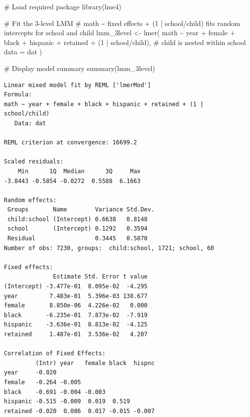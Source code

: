 \documentclass[
  letterpaper,
  DIV=11,
  numbers=noendperiod]{scrreprt}
\newenvironment{Shaded}{\begin{snugshade}}{\end{snugshade}}
\newcommand{\AttributeTok}[1]{\textcolor[rgb]{0.40,0.45,0.13}{#1}}
\newcommand{\CommentTok}[1]{\textcolor[rgb]{0.37,0.37,0.37}{#1}}
\newcommand{\DecValTok}[1]{\textcolor[rgb]{0.68,0.00,0.00}{#1}}
\newcommand{\FunctionTok}[1]{\textcolor[rgb]{0.28,0.35,0.67}{#1}}
\newcommand{\NormalTok}[1]{\textcolor[rgb]{0.00,0.23,0.31}{#1}}
\newcommand{\OtherTok}[1]{\textcolor[rgb]{0.00,0.23,0.31}{#1}}
\newcommand{\SpecialCharTok}[1]{\textcolor[rgb]{0.37,0.37,0.37}{#1}}
\begin{document}
\begin{Shaded}
\begin{Highlighting}[]
\CommentTok{\# Load required package}
\FunctionTok{library}\NormalTok{(lme4)}

\CommentTok{\# Fit the 3{-}level LMM}
\CommentTok{\# math \textasciitilde{} fixed effects + (1 | school/child) fits random intercepts for school and child}
\NormalTok{lmm\_3level }\OtherTok{\textless{}{-}} \FunctionTok{lmer}\NormalTok{(}
\NormalTok{  math }\SpecialCharTok{\textasciitilde{}}\NormalTok{ year }\SpecialCharTok{+}\NormalTok{ female }\SpecialCharTok{+}\NormalTok{ black }\SpecialCharTok{+}\NormalTok{ hispanic }\SpecialCharTok{+}\NormalTok{ retained }\SpecialCharTok{+} 
\NormalTok{    (}\DecValTok{1} \SpecialCharTok{|}\NormalTok{ school}\SpecialCharTok{/}\NormalTok{child),  }\CommentTok{\# child is nested within school}
  \AttributeTok{data =}\NormalTok{ dat}
\NormalTok{)}

\CommentTok{\# Display model summary}
\FunctionTok{summary}\NormalTok{(lmm\_3level)}
\end{Highlighting}
\end{Shaded}

\begin{verbatim}
Linear mixed model fit by REML ['lmerMod']
Formula: 
math ~ year + female + black + hispanic + retained + (1 | school/child)
   Data: dat

REML criterion at convergence: 16699.2

Scaled residuals: 
    Min      1Q  Median      3Q     Max 
-3.8443 -0.5854 -0.0272  0.5588  6.1663 

Random effects:
 Groups       Name        Variance Std.Dev.
 child:school (Intercept) 0.6638   0.8148  
 school       (Intercept) 0.1292   0.3594  
 Residual                 0.3445   0.5870  
Number of obs: 7230, groups:  child:school, 1721; school, 60

Fixed effects:
              Estimate Std. Error t value
(Intercept) -3.477e-01  8.095e-02  -4.295
year         7.483e-01  5.396e-03 138.677
female       8.850e-06  4.226e-02   0.000
black       -6.235e-01  7.873e-02  -7.919
hispanic    -3.636e-01  8.813e-02  -4.125
retained     1.487e-01  3.536e-02   4.207

Correlation of Fixed Effects:
         (Intr) year   female black  hispnc
year     -0.020                            
female   -0.264 -0.005                     
black    -0.691 -0.004 -0.003              
hispanic -0.515 -0.009  0.019  0.519       
retained -0.020  0.086  0.017 -0.015 -0.007
\end{verbatim}
\end{document}

